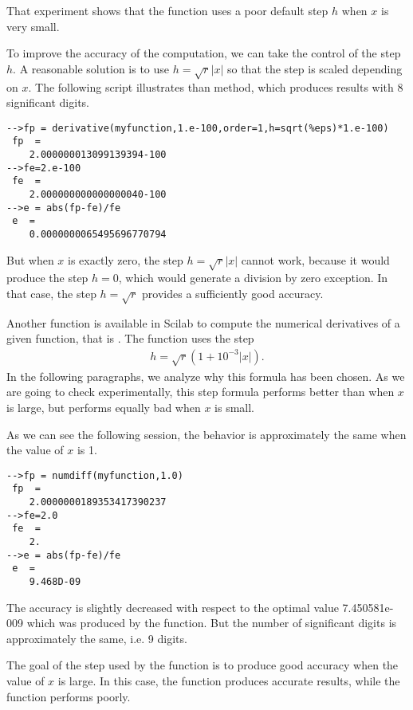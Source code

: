 That experiment shows that the  function uses a 
poor default step $h$ when $x$ is very small.

To improve the accuracy of the computation, we can take the control of the 
step $h$. A reasonable solution is to use $h=\sqrt{r}|x|$ so that the 
step is scaled depending on $x$. 
The following script illustrates than method, which produces 
results with 8 significant digits.
\begin{lstlisting}
-->fp = derivative(myfunction,1.e-100,order=1,h=sqrt(%eps)*1.e-100)
 fp  =
    2.000000013099139394-100  
-->fe=2.e-100
 fe  =
    2.000000000000000040-100  
-->e = abs(fp-fe)/fe
 e  =
    0.0000000065495696770794  
\end{lstlisting}

But when $x$ is exactly zero, the step $h=\sqrt{r}|x|$ cannot work, because 
it would produce the step $h=0$, which would generate a division by zero
exception. In that case, the step $h=\sqrt{r}$ provides a sufficiently 
good accuracy.

Another function is available in Scilab to compute the 
numerical derivatives of a given function, that is .
The  function uses the step 
\begin{eqnarray}
h=\sqrt{r}(1+10^{-3}|x|).
\end{eqnarray}
In the following paragraphs, we analyze why this formula 
has been chosen. As we are going to check experimentally, this step
formula performs better than  when $x$ is 
large, but performs equally bad when $x$ is small.

As we can see the following session, the behavior is approximately 
the same when the value of $x$ is 1.
\begin{lstlisting}
-->fp = numdiff(myfunction,1.0)
 fp  =
    2.0000000189353417390237  
-->fe=2.0
 fe  =
    2.  
-->e = abs(fp-fe)/fe
 e  =
    9.468D-09  
\end{lstlisting}

The accuracy is slightly decreased with respect to the optimal
value 7.450581e-009 which was produced by the  function. 
But the number of significant digits is approximately the same, i.e. 9 digits.

The goal of the step used by the  function is to produce good 
accuracy when the value of $x$ is large. In this case, the  function 
produces accurate results, while the  function performs poorly.

